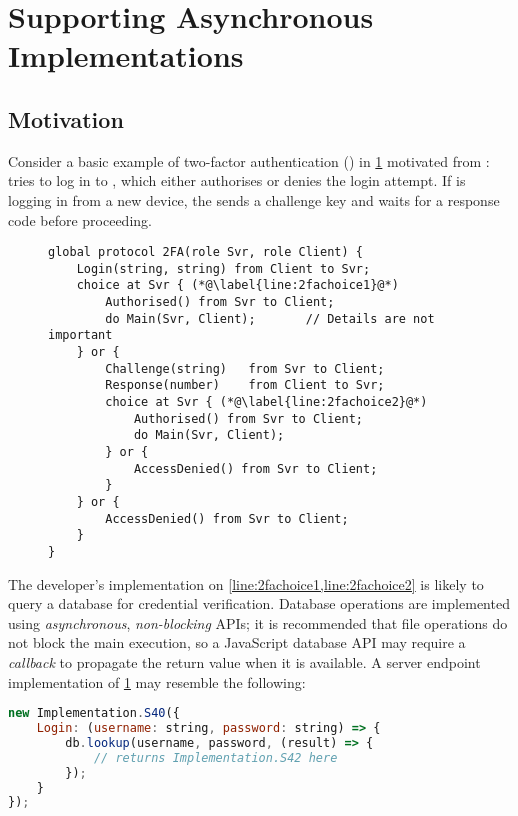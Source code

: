 \section{Supporting Asynchronous Implementations}
\label{section:async}

\subsection{Motivation}

Consider a basic example of two-factor authentication 
() in \cref{lst:2FA} motivated from \cite{Exceptional}:
 tries to log in to , which either
authorises or denies the login attempt. If  is logging 
in from a new device, the  sends a challenge key
and waits for a response code before proceeding.

\begin{figure}[!h]
\begin{lstlisting}[language=scribble]
global protocol 2FA(role Svr, role Client) {
	Login(string, string) from Client to Svr;
	choice at Svr { (*@\label{line:2fachoice1}@*)
		Authorised() from Svr to Client;
		do Main(Svr, Client);		// Details are not important
	} or {
		Challenge(string)	from Svr to Client;
		Response(number) 	from Client to Svr;
		choice at Svr { (*@\label{line:2fachoice2}@*)
			Authorised() from Svr to Client;
			do Main(Svr, Client);
		} or {
			AccessDenied() from Svr to Client;
		}
	} or {
		AccessDenied() from Svr to Client;	
	}
}
\end{lstlisting}
\label{lst:2FA}
\end{figure}

The developer's implementation on 
\cref{line:2fachoice1,line:2fachoice2} is likely to query
a database for credential verification.
Database operations are implemented using \textit{asynchronous},
\textit{non-blocking} APIs; it is
recommended that file operations do not block the main execution,
so a JavaScript database API may require a \textit{callback}
to propagate the return value when it is available.
A server endpoint implementation of \cref{lst:2FA}
may resemble the following:

\begin{lstlisting}[language=javascript]
new Implementation.S40({
	Login: (username: string, password: string) => {
		db.lookup(username, password, (result) => {
			// returns Implementation.S42 here
		});
	}
});
\end{lstlisting}

